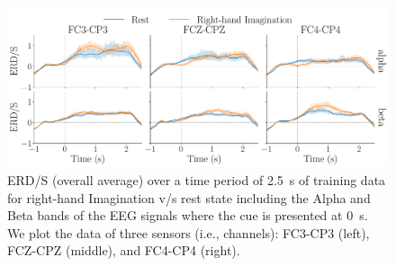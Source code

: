 \begin{figure}
\begin{center}
    \includegraphics[width=0.85\columnwidth]{braincontrol/figures/eeg_pipeline/ERDS.pdf}
    \caption{ERD/S (overall average) over a time period of \SI{2.5}{s} of training data for right-hand Imagination v/s rest state including the Alpha and Beta bands of the EEG signals where the cue is presented at \SI{0}{s}. We plot the data of three sensors (i.e., channels): FC3-CP3 (left), FCZ-CPZ (middle), and FC4-CP4 (right).}
    \label{fig:braincontrol:ERDS}
\end{center}
\end{figure}

